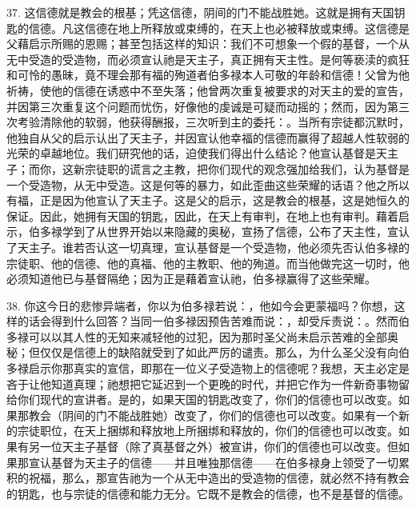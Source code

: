 37. 这信德就是教会的根基；凭这信德，阴间的门不能战胜她。这就是拥有天国钥匙的信德。凡这信德在地上所释放或束缚的，在天上也必被释放或束缚。这信德是父藉启示所赐的恩赐；甚至包括这样的知识：我们不可想象一个假的基督，一个从无中受造的受造物，而必须宣认祂是天主子，真正拥有天主性。是何等亵渎的疯狂和可怜的愚昧，竟不理会那有福的殉道者伯多禄本人可敬的年龄和信德！父曾为他祈祷，使他的信德在诱惑中不至失落；他曾两次重复被要求的对天主的爱的宣告，并因第三次重复这个问题而忧伤，好像他的虔诚是可疑而动摇的；然而，因为第三次考验清除他的软弱，他获得酬报，三次听到主的委托：。当所有宗徒都沉默时，他独自从父的启示认出了天主子，并因宣认他幸福的信德而赢得了超越人性软弱的光荣的卓越地位。我们研究他的话，迫使我们得出什么结论？他宣认基督是天主子；而你，这新宗徒职的谎言之主教，把你们现代的观念强加给我们，认为基督是一个受造物，从无中受造。这是何等的暴力，如此歪曲这些荣耀的话语？他之所以有福，正是因为他宣认了天主子。这是父的启示，这是教会的根基，这是她恒久的保证。因此，她拥有天国的钥匙，因此，在天上有审判，在地上也有审判。藉着启示，伯多禄学到了从世界开始以来隐藏的奥秘，宣扬了信德，公布了天主性，宣认了天主子。谁若否认这一切真理，宣认基督是一个受造物，他必须先否认伯多禄的宗徒职、他的信德、他的真福、他的主教职、他的殉道。而当他做完这一切时，他必须知道他已与基督隔绝；因为正是藉着宣认祂，伯多禄赢得了这些荣耀。\par

38. 你这今日的悲惨异端者，你以为伯多禄若说：，他如今会更蒙福吗？你想，这样的话会得到什么回答？当同一伯多禄因预告苦难而说：，却受斥责说：。然而伯多禄可以以其人性的无知来减轻他的过犯，因为那时圣父尚未启示苦难的全部奥秘；但仅仅是信德上的缺陷就受到了如此严厉的谴责。那么，为什么圣父没有向伯多禄启示你那真实的宣信，即那在一位义子受造物上的信德呢？我想，天主必定是吝于让他知道真理；祂想把它延迟到一个更晚的时代，并把它作为一件新奇事物留给你们现代的宣讲者。是的，如果天国的钥匙改变了，你们的信德也可以改变。如果那教会（阴间的门不能战胜她）改变了，你们的信德也可以改变。如果有一个新的宗徒职位，在天上捆绑和释放地上所捆绑和释放的，你们的信德也可以改变。如果有另一位天主子基督（除了真基督之外）被宣讲，你们的信德也可以改变。但如果那宣认基督为天主子的信德——并且唯独那信德——在伯多禄身上领受了一切累积的祝福，那么，那宣告祂为一个从无中造出的受造物的信德，就必然不持有教会的钥匙，也与宗徒的信德和能力无分。它既不是教会的信德，也不是基督的信德。\par

